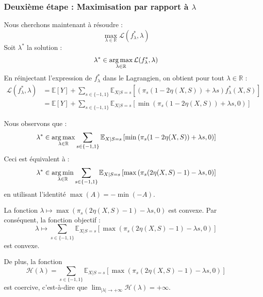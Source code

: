 \subsubsection{Deuxième étape : Maximisation par rapport à $\lambda$}

Nous cherchons maintenant à résoudre :
\begin{equation}
    \max_{\lambda \in \mathbb{R}} \mathcal{L}(f^*_{\lambda}, \lambda)
\end{equation}
Soit $\lambda^*$ la solution :
\begin{equation}
    \lambda^* \in \operatorname*{arg\,max}_{\lambda \in \mathbb{R}} \mathcal{L}(f^*_{\lambda}, \lambda)
\end{equation}
En réinjectant l'expression de $f^*_{\lambda}$ dans le Lagrangien, on obtient pour tout $\lambda \in \mathbb{R}$ :
\begin{align}
    \mathcal{L}(f^*_{\lambda}, \lambda) &= \mathbb{E}[Y] + \sum_{s \in \{-1, 1\}} \mathbb{E}_{X|S=s} \left[ \left( \pi_s (1 - 2\eta(X,S)) + \lambda s \right) f^*_{\lambda}(X,S) \right] \nonumber \\
    &= \mathbb{E}[Y] + \sum_{s \in \{-1, 1\}} \mathbb{E}_{X|S=s} \left[ \min\left( \pi_s (1 - 2\eta(X,S)) + \lambda s, 0 \right) \right]
\end{align}

Nous observons que :
\begin{equation*}
    \lambda^* \in \operatorname*{arg\,max}_{\lambda \in \mathbb{R}} \sum_{s \in \{-1, 1\}} \mathbb{E}_{X|S=s} \left[ \min\left( \pi_s (1 - 2\eta(X,S)) + \lambda s, 0 \right) \right]
\end{equation*}
Ceci est équivalent à :
\begin{equation}
    \lambda^* \in \operatorname*{arg\,min}_{\lambda \in \mathbb{R}} \sum_{s \in \{-1, 1\}} \mathbb{E}_{X|S=s} \left[ \max\left( \pi_s (2\eta(X,S) - 1) - \lambda s, 0 \right) \right]
\end{equation}
en utilisant l'identité $\max(A) = - \min(-A)$.

La fonction $\lambda \mapsto \max(\pi_s (2\eta(X,S) - 1) - \lambda s, 0)$ est convexe.
Par conséquent, la fonction objectif :
\begin{equation*}
    \lambda \mapsto \sum_{s \in \{-1, 1\}} \mathbb{E}_{X|S=s} \left[ \max\left( \pi_s (2\eta(X,S) - 1) - \lambda s, 0 \right) \right]
\end{equation*}
est convexe.

De plus, la fonction
\begin{equation}
    \mathcal{H}(\lambda) = \sum_{s \in \{-1, 1\}} \mathbb{E}_{X|S=s} \left[ \max\left( \pi_s (2\eta(X,S) - 1) - \lambda s, 0 \right) \right]
\end{equation}
est coercive, c'est-à-dire que $\lim_{|\lambda| \to +\infty} \mathcal{H}(\lambda) = +\infty$.

